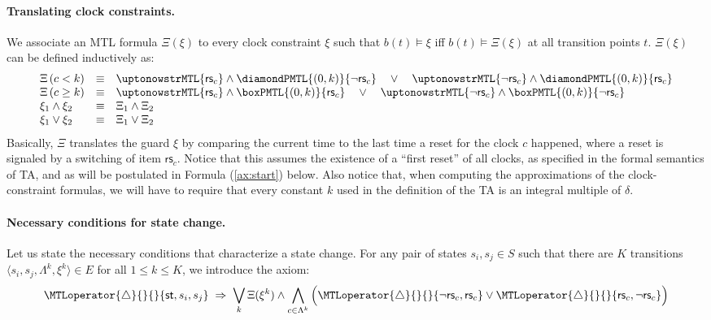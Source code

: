 \documentclass[a4paper]{article}
\newcommand{\frf}[1]{(\ref{#1})}
\newcommand{\st}{\mathsf{st}}
\newcommand{\rest}[1]{\mathsf{rs}_{#1}}
\newcommand{\becomesMTL}[1]{\MTLoperator{\triangle}{}{}{#1}}
\theoremstyle{plain}
\theoremstyle{definition}
\begin{document}
\paragraph{Translating clock constraints.}
We associate an MTL formula $\Xi(\xi)$ to every clock constraint $\xi$ such that $b(t) \models \xi$ iff $b(t) \models \Xi(\xi)$ at all transition points $t$.
$\Xi(\xi)$ can be defined inductively as:
\begin{displaymath}
  \begin{array}{lcl}
	 \Xi\left(c < k\right)      &   \equiv  &
              \uptonowstrMTL{\rest{c}} \wedge \diamondPMTL{(0, k)}{\neg \rest{c}}
               \quad \vee \quad \uptonowstrMTL{\neg \rest{c}} \wedge \diamondPMTL{(0, k)}{\rest{c}}\\
	 \Xi\left(c \geq k\right)      &   \equiv  &
              \uptonowstrMTL{\rest{c}} \wedge \boxPMTL{(0, k)}{\rest{c}}
              \quad \vee \quad \uptonowstrMTL{\neg \rest{c}} \wedge \boxPMTL{(0, k)}{\neg \rest{c}} \\
	 \xi_1 \wedge \xi_2  &   \equiv &  \Xi_1 \wedge \Xi_2 \\
	 \xi_1 \vee \xi_2  &   \equiv  &  \Xi_1 \vee \Xi_2
  \end{array}
\end{displaymath}
Basically, $\Xi$ translates the guard $\xi$ by comparing the current time to the last time a reset for the clock $c$ happened, where a reset is signaled by a switching of item $\rest{c}$.
Notice that this assumes the existence of a ``first reset'' of all clocks, as specified in the formal semantics of TA, and as will be postulated in Formula \frf{ax:start} below.
Also notice that, when computing the approximations of the clock-constraint formulas, we will have to require that every constant $k$ used in the definition of the TA is an integral multiple of $\delta$.




\paragraph{Necessary conditions for state change.}
Let us state the necessary conditions that characterize a state change.
For any pair of states $s_i, s_j \in S$ such that there are $K$ transitions $\langle s_i, s_j, \Lambda^k, \xi^k \rangle \in E$ for all $1 \leq k \leq K$, we introduce the axiom:
\begin{multline} \label{ax:si2sj}
  \becomesMTL{\st, s_i, s_j} \;\Rightarrow\; 
     \bigvee_k  \Xi(\xi^k) \wedge \bigwedge_{c \in \Lambda^k}
               \Big( \becomesMTL{\neg \rest{c}, \rest{c}} \vee \becomesMTL{\rest{c}, \neg \rest{c}} \Big)
\end{multline}
\end{document}
